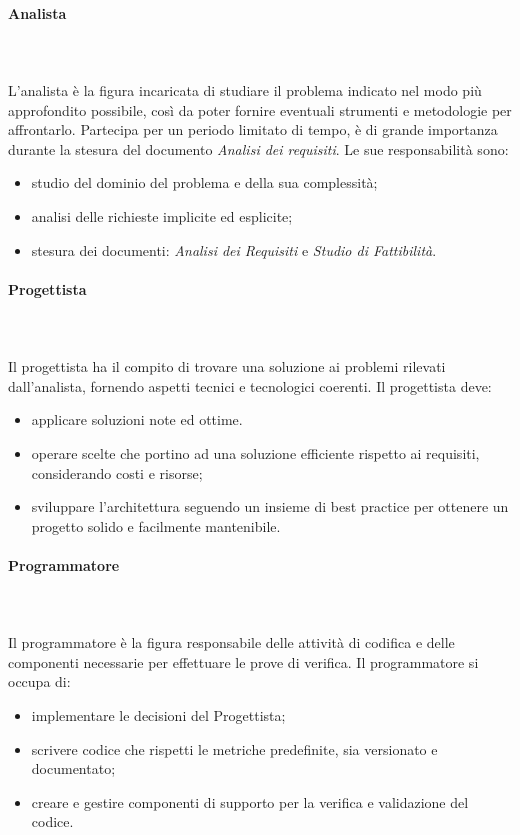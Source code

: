 			\paragraph{Analista} \mbox{}\\ \mbox{}\\
			L'analista è la figura incaricata di studiare il problema indicato nel modo più approfondito possibile, così da poter fornire eventuali strumenti e metodologie per affrontarlo. 
			Partecipa per un periodo limitato di tempo, è di grande importanza durante la stesura del documento \textit{Analisi dei requisiti}.\newline
			Le sue responsabilità sono:
			\begin{itemize}
				\item studio del dominio del problema e della sua complessità;
				\item analisi delle richieste implicite ed esplicite;
				\item stesura dei documenti: \textit{Analisi dei Requisiti} e \textit{Studio di Fattibilità}.
			\end{itemize}
			\paragraph{Progettista} \mbox{}\\ \mbox{}\\
			Il progettista ha il compito di trovare una soluzione ai problemi rilevati dall'analista, fornendo aspetti tecnici e tecnologici coerenti.\newline
			Il progettista deve:
			\begin{itemize}
				\item applicare soluzioni note ed ottime.
				\item operare scelte che portino ad una soluzione efficiente rispetto ai requisiti, considerando costi e risorse;
				\item sviluppare l'architettura seguendo un insieme di best practice per ottenere un progetto solido e facilmente mantenibile.
			\end{itemize}
			\paragraph{Programmatore} \mbox{}\\ \mbox{}\\
			Il programmatore è la figura responsabile delle attività di codifica e delle componenti necessarie per effettuare le prove di verifica.
			Il programmatore si occupa di:
			\begin{itemize}
				\item implementare le decisioni del Progettista;
				\item scrivere codice che rispetti le metriche predefinite, sia versionato e documentato;
				\item creare e gestire componenti di supporto per la verifica e validazione del codice.
			\end{itemize}
